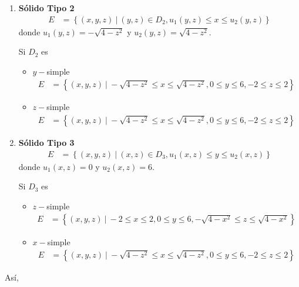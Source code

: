 \documentclass[12pt]{exam}
\begin{document}
\begin{questions}
\begin{enumerate}
  \item \textbf{Sólido Tipo 2}
    \begin{align*}
      E &= \left\{ (x,y,z) ~|~ (y,z) \in D_2, u_1(y,z) \leq x \leq u_2(y,z) \right\}
    \end{align*}
    donde $u_1(y,z) = -\sqrt{4-z^2}$ y $u_2(y,z) = \sqrt{4-z^2}$.

    Si $D_2$ es 

    \begin{itemize}
    \item $y-$simple
      \begin{align*}
        E &= \left\{ (x,y,z) ~|~ -\sqrt{4-z^2} \leq x \leq \sqrt{4-z^2}, 0 \leq y \leq 6, -2 \leq z \leq 2 \right\}
      \end{align*}

    \item $z-$simple
      \begin{align*}
        E &= \left\{ (x,y,z) ~|~ -\sqrt{4-z^2} \leq x \leq \sqrt{4-z^2}, 0 \leq y \leq 6, -2 \leq z \leq 2 \right\}
      \end{align*}
    \end{itemize}

  \item \textbf{Sólido Tipo 3}
    \begin{align*}
      E &= \left\{ (x,y,z) ~|~ (x,z) \in D_3, u_1(x,z) \leq y \leq u_2(x,z) \right\}
    \end{align*}
    donde $u_1(x,z) = 0$ y $u_2(x,z) = 6$.

    Si $D_3$ es 
    
    \begin{itemize}
    \item $z-$simple
      \begin{align*}
        E &= \left\{ (x,y,z) ~|~ -2 \leq x \leq 2, 0 \leq y \leq 6, -\sqrt{4-x^2} \leq z \leq \sqrt{4-x^2} \right\}
      \end{align*}

    \item $x-$simple
      \begin{align*}
        E &= \left\{ (x,y,z) ~|~ -\sqrt{4-z^2} \leq x \leq \sqrt{4-z^2}, 0 \leq y \leq 6, -2 \leq z \leq 2 \right\}
      \end{align*}
    \end{itemize}

  \end{enumerate}

  Así,
  

\end{questions}
\end{document}
